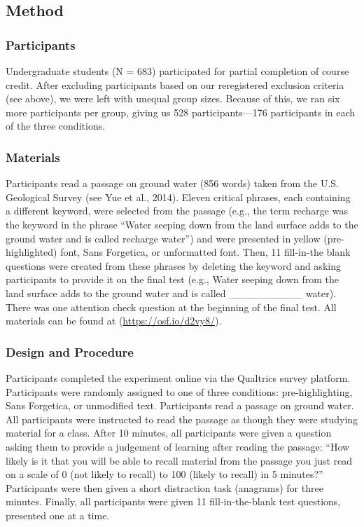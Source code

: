 \documentclass[jou]{apa6}
\begin{document}
\hypertarget{method-1}{%
\subsection{Method}\label{method-1}}

\hypertarget{participants-1}{%
\subsubsection{Participants}\label{participants-1}}

Undergraduate students (N = 683) participated for partial completion of course credit. After excluding participants based on our reregistered exclusion criteria (see above), we were left with unequal group sizes. Because of this, we ran six more participants per group, giving us 528 participants---176 participants in each of the three conditions.

\hypertarget{materials}{%
\subsubsection{Materials}\label{materials}}

Participants read a passage on ground water (856 words) taken from the U.S. Geological Survey (see Yue et al., 2014). Eleven critical phrases, each containing a different keyword, were selected from the passage (e.g., the term recharge was the keyword in the phrase \enquote{Water seeping down from the land surface adds to the ground water and is called recharge water}) and were presented in yellow (pre-highlighted) font, Sans Forgetica, or unformatted font. Then, 11 fill-in-the blank questions were created from these phrases by deleting the keyword and asking participants to provide it on the final test (e.g., Water seeping down from the land surface adds to the ground water and is called \_\_\_\_\_\_\_\_\_\_ water). There was one attention check question at the beginning of the final test. All materials can be found at (\url{https://osf.io/d2vy8/}).

\hypertarget{design-and-procedure}{%
\subsubsection{Design and Procedure}\label{design-and-procedure}}

Participants completed the experiment online via the Qualtrics survey platform. Participants were randomly assigned to one of three conditions: pre-highlighting, Sans Forgetica, or unmodified text. Participants read a passage on ground water. All participants were instructed to read the passage as though they were studying material for a class. After 10 minutes, all participants were given a question asking them to provide a judgement of learning after reading the passage: \enquote{How likely is it that you will be able to recall material from the passage you just read on a scale of 0 (not likely to recall) to 100 (likely to recall) in 5 minutes?} Participants were then given a short distraction task (anagrams) for three minutes. Finally, all participants were given 11 fill-in-the-blank test questions, presented one at a time.
\end{document}
